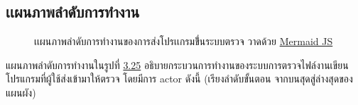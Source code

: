 \documentclass[12pt,oneside,openright,a4paper]{cpe-thai-project}
\begin{document}
    \subsection{เเผนภาพลำดับการทำงาน}
         \hypertarget{seq-diagram1}{
                \begin{figure}[!h]
                \centering
                    \caption[ภาพเเผนภาพลำดับการทำงาน]{เเผนภาพลำดับการทำงานของการส่งโปรเเกรมขึ่้นระบบตรวจ วาดด้วย \href{https://mermaid.js.org/}{Mermaid JS}}
                    \label{fig:seq-diagram1}
                \end{figure}
            }
        \begin{flushleft}
        แผนภาพลำดับการทำงานในรูปที่ \hyperlink{comp-diagram}{3.25} อธิบายกระบวนการทำงานของระบบการตรวจไฟล์งานเขียนโปรแกรมที่ผู้ใช้ส่งเข้ามาให้ตรวจ โดยมีการ actor ดังนี้ (เรียงลำดับขั้นตอน จากบนสุดสู่ล่างสุดของแผนผัง)
        \end{flushleft}
\end{document}
